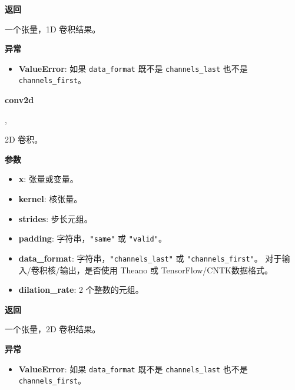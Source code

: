 \textbf{返回}

一个张量，1D 卷积结果。

\textbf{异常}

\begin{itemize}
\tightlist
\item
  \textbf{ValueError}: 如果 \texttt{data\_format} 既不是
  \texttt{channels\_last} 也不是 \texttt{channels\_first}。
\end{itemize}


\textbf{conv2d}\label{conv2d}

\begin{Shaded}
\begin{Highlighting}[]
\OperatorTok{=}\NormalTok{(}\NormalTok{, }\OperatorTok{=}, \\
\hspace{3cm}\OperatorTok{=}\OperatorTok{=}\NormalTok{(}\NormalTok{, }\NormalTok{))}
\end{Highlighting}
\end{Shaded}

2D 卷积。

\textbf{参数}

\begin{itemize}
\tightlist
\item
  \textbf{x}: 张量或变量。
\item
  \textbf{kernel}: 核张量。
\item
  \textbf{strides}: 步长元组。
\item
  \textbf{padding}: 字符串，\texttt{"same"} 或 \texttt{"valid"}。
\item
  \textbf{data\_format}: 字符串，\texttt{"channels\_last"} 或
  \texttt{"channels\_first"}。 对于输入/卷积核/输出，是否使用 Theano 或
  TensorFlow/CNTK数据格式。
\item
  \textbf{dilation\_rate}: 2 个整数的元组。
\end{itemize}

\textbf{返回}

一个张量，2D 卷积结果。

\textbf{异常}

\begin{itemize}
\tightlist
\item
  \textbf{ValueError}: 如果 \texttt{data\_format} 既不是
  \texttt{channels\_last} 也不是 \texttt{channels\_first}。
\end{itemize}


